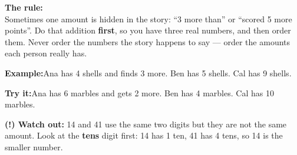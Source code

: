 \documentclass[12pt]{article}
\begin{document}
\begin{formulabox}\textbf{The rule:}\\[4pt]
Sometimes one amount is hidden in the story: ``3 more than'' or ``scored 5 more points''.
Do that addition \textbf{first}, so you have three real numbers, and then order them.
Never order the numbers the story happens to say --- order the amounts each person really has.
\end{formulabox}
\begin{examplebox}\textbf{Example:}\quad Ana has 4 shells and finds 3 more. Ben has 5 shells. Cal has 9 shells.
\end{examplebox}
\begin{tryitbox}\textbf{Try it:}\quad Ana has 6 marbles and gets 2 more. Ben has 4 marbles. Cal has 10 marbles.\\[2pt]
\end{tryitbox}

\begin{watchoutbox}\textbf{(!) Watch out:} 14 and 41 use the same two digits but they
are not the same amount. Look at the \textbf{tens} digit first: 14 has 1 ten, 41 has 4 tens,
so 14 is the smaller number.
\end{watchoutbox}
\end{document}
